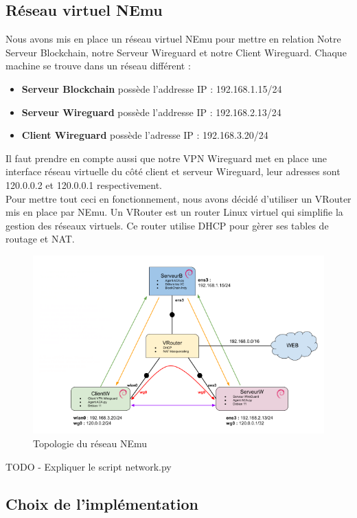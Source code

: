 \documentclass[12pt, openany]{report}
\begin{document}
\subsection{Réseau virtuel NEmu}
\noindent 
\begin{flushleft}

Nous avons mis en place un réseau virtuel NEmu pour mettre en relation Notre Serveur Blockchain, notre Serveur Wireguard et notre Client Wireguard. Chaque machine se trouve dans un réseau différent : 
\begin{itemize}
\item \textbf{Serveur Blockchain} possède l'addresse IP : 192.168.1.15/24
\item \textbf{Serveur Wireguard} possède l'addresse IP : 192.168.2.13/24
\item \textbf{Client Wireguard} possède l'adresse IP : 192.168.3.20/24
\end{itemize}
Il faut prendre en compte aussi que notre VPN Wireguard met en place une interface réseau virtuelle du côté client et serveur Wireguard, leur adresses sont 120.0.0.2 et 120.0.0.1 respectivement. \\
Pour mettre tout ceci en fonctionnement, nous avons décidé d'utiliser un VRouter mis en place par NEmu. Un VRouter est un router Linux virtuel qui simplifie la gestion des réseaux virtuels. Ce router utilise DHCP pour gèrer ses tables de routage et NAT.

\begin{figure}[H]
\includegraphics[scale=0.85]{topo.png}
\centering
\caption{Topologie du réseau NEmu}
\end{figure}

TODO - Expliquer le script network.py

\subsection{Choix de l'implémentation}


\end{flushleft}
\end{document}
